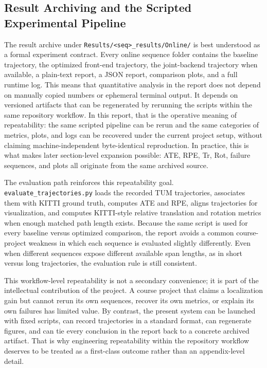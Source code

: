 \documentclass[a4paper,12pt]{article}
\newcommand{\code}[1]{\nolinkurl{#1}}
\begin{document}
\subsection{Result Archiving and the Scripted Experimental Pipeline}
The result archive under \code{Results/<seq>_results/Online/} is best understood as a formal experiment contract. Every online sequence folder contains the baseline trajectory, the optimized front-end trajectory, the joint-backend trajectory when available, a plain-text report, a JSON report, comparison plots, and a full runtime log. This means that quantitative analysis in the report does not depend on manually copied numbers or ephemeral terminal output. It depends on versioned artifacts that can be regenerated by rerunning the scripts within the same repository workflow. In this report, that is the operative meaning of repeatability: the same scripted pipeline can be rerun and the same categories of metrics, plots, and logs can be recovered under the current project setup, without claiming machine-independent byte-identical reproduction. In practice, this is what makes later section-level expansion possible: ATE, RPE, Tr, Rot, failure sequences, and plots all originate from the same archived source.

The evaluation path reinforces this repeatability goal. \code{evaluate_trajectories.py} loads the recorded TUM trajectories, associates them with KITTI ground truth, computes ATE and RPE, aligns trajectories for visualization, and computes KITTI-style relative translation and rotation metrics when enough matched path length exists. Because the same script is used for every baseline versus optimized comparison, the report avoids a common course-project weakness in which each sequence is evaluated slightly differently. Even when different sequences expose different available span lengths, as in short versus long trajectories, the evaluation rule is still consistent.

This workflow-level repeatability is not a secondary convenience; it is part of the intellectual contribution of the project. A course project that claims a localization gain but cannot rerun its own sequences, recover its own metrics, or explain its own failures has limited value. By contrast, the present system can be launched with fixed scripts, can record trajectories in a standard format, can regenerate figures, and can tie every conclusion in the report back to a concrete archived artifact. That is why engineering repeatability within the repository workflow deserves to be treated as a first-class outcome rather than an appendix-level detail.
\end{document}
